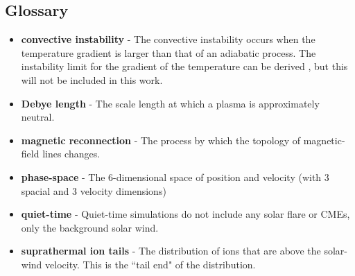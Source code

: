\documentclass[%
 reprint,
 amsmath,amssymb,
 aps,
]{revtex4-1}
\begin{document}
\subsection{Glossary}

\begin{itemize}

\item \textbf{convective instability} - The convective instability occurs when the temperature gradient is larger than that of an adiabatic process. The instability limit for the gradient of the temperature can be derived \cite{moaz}, but this will not be included in this work.

\item \textbf{Debye length} - The scale length at which a plasma is approximately neutral.

\item \textbf{magnetic reconnection} - The process by which the topology of magnetic-field lines changes.

\item \textbf{phase-space} - The 6-dimensional space of position and velocity (with 3 spacial and 3 velocity dimensions)

\item \textbf{quiet-time} - Quiet-time simulations do not include any solar flare or CMEs, only the background solar wind.

\item \textbf{suprathermal ion tails} - The distribution of ions that are above the solar-wind velocity. This is the ``tail end" of the distribution.


\end{itemize}
\end{document}
